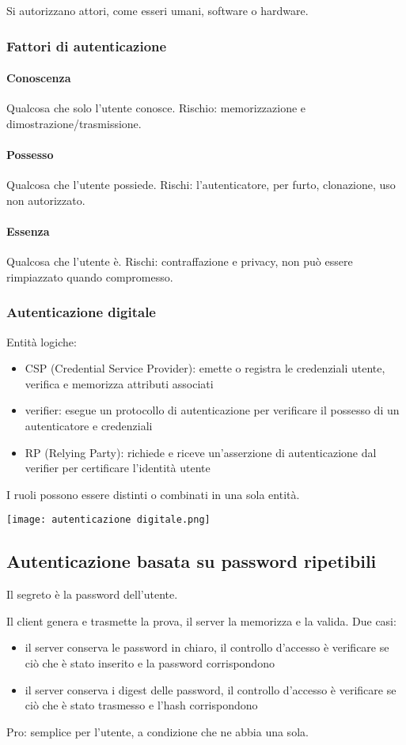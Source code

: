 \documentclass[11pt]{article}
\begin{document}
Si autorizzano attori, come esseri umani, software o hardware.
\subsubsection{Fattori di autenticazione}
\paragraph*{Conoscenza}
Qualcosa che solo l'utente conosce. Rischio: memorizzazione e dimostrazione/trasmissione.
\paragraph*{Possesso}
Qualcosa che l'utente possiede.  Rischi: l'autenticatore, per furto, clonazione, uso non autorizzato.
\paragraph*{Essenza}
Qualcosa che l'utente è. Rischi: contraffazione e privacy, non può essere rimpiazzato quando compromesso.
\subsubsection{Autenticazione digitale}
Entità logiche:
\begin{itemize}
    \item CSP (Credential Service Provider): emette o registra le credenziali utente, verifica e memorizza attributi associati 
    \item verifier: esegue un protocollo di autenticazione per verificare il possesso di un autenticatore e credenziali 
    \item RP (Relying Party): richiede e riceve un'asserzione di autenticazione dal verifier per certificare l'identità utente 
\end{itemize}
I ruoli possono essere distinti o combinati in una sola entità.
\begin{center}
    \texttt{[image: autenticazione digitale.png]}
\end{center}
\subsection{Autenticazione basata su password ripetibili}
Il segreto è la password dell'utente. 

Il client genera e trasmette la prova, il server la memorizza e la valida. Due casi:
\begin{itemize}
    \item il server conserva le password in chiaro, il controllo d'accesso è verificare se ciò che è stato inserito e la 
    password corrispondono 
    \item il server conserva i digest delle password, il controllo d'accesso è verificare se ciò che è stato trasmesso e 
    l'hash corrispondono 
\end{itemize}
Pro: semplice per l'utente, a condizione che ne abbia una sola.
\end{document}
